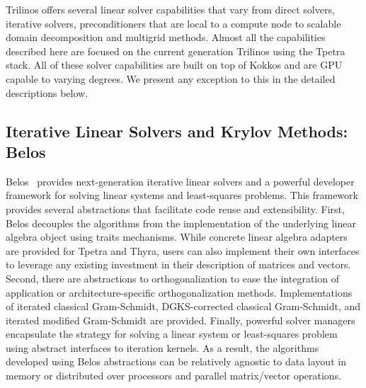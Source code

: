 
Trilinos offers several linear solver capabilities that vary from direct solvers, iterative solvers, preconditioners that are local to a compute node to scalable domain decomposition and multigrid methods. Almost all the capabilities described here are focused on the current generation Trilinos using the Tpetra stack. All of these solver capabilities are built on top of Kokkos and are GPU capable to varying degrees. We present any exception to this in the detailed descriptions below.

\subsection{Iterative Linear Solvers and Krylov Methods: Belos}

Belos~\cite{Bavier2012a} provides next-generation iterative linear solvers and 
a powerful developer framework for solving linear systems and least-squares problems.
This framework provides several abstractions that facilitate code reuse and extensibility.
First, Belos decouples the algorithms from the implementation of the underlying linear
algebra object using traits mechanisms.  While concrete linear algebra adapters are provided
for Tpetra and Thyra, users can also implement their own interfaces to leverage any
existing investment in their description of matrices and vectors.  Second, there are abstractions
to orthogonalization to ease the integration of application or architecture-specific orthogonalization
methods. Implementations of iterated classical Gram-Schmidt, DGKS-corrected classical Gram-Schmidt,
and iterated modified Gram-Schmidt are provided.  Finally, powerful solver managers encapsulate the 
strategy for solving a linear system or least-squares problem using abstract interfaces to iteration 
kernels.  As a result, the algorithms developed using Belos abstractions can be relatively agnostic
to data layout in memory or distributed over processors and parallel matrix/vector operations.

